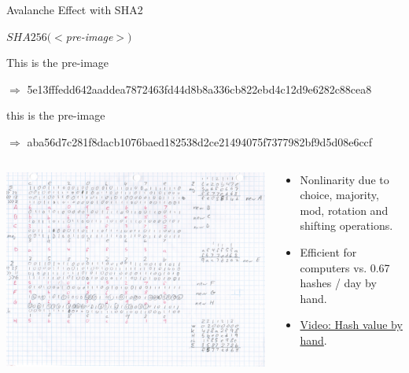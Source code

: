 \documentclass[]{beamer}
\begin{document}
\begin{frame}{Avalanche Effect with SHA2}

\begin{center}
$SHA256(<$\textit{pre-image}$>)$
\end{center}

This is the pre-image

$\Rightarrow$ \footnotesize 5e13fffedd642aaddea7872463fd44d8b8a336cb822ebd4c12d9e6282c88cea8 \normalsize
\vspace{1em}

\color{focus}t\color{black}his is the pre-image

$\Rightarrow$ \footnotesize \color{focus}aba56d7c281f8d\color{black}a\color{focus}cb1076baed182538d2ce21494075f7377982bf9d5d0\color{black}8\color{focus}e6ccf\color{black} \normalsize
\vspace{1em}

\begin{columns}[T]
	\begin{column}{0.35\textwidth}
		\includegraphics[width = 4 cm, frame]{../assets/images/manual_hashing_video.png}
	\end{column} %
	\begin{column}{0.65\textwidth}
		\begin{itemize}
			\item Nonlinarity due to choice, majority, mod, rotation and shifting operations.
			\item Efficient for computers vs. 0.67 hashes / day by hand.
			\item \link \href{https://www.youtube.com/watch?v=y3dqhixzGVo}{Video: Hash value by hand}.
		\end{itemize}
	\end{column}
\end{columns}

	
\end{frame}
\end{document}
